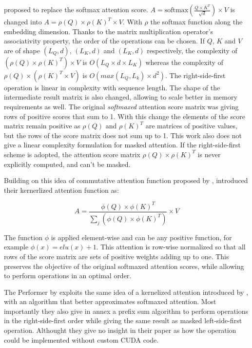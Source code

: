 \citet{shen2020efficient} proposed to
 replace the softmax attention score.
 $A = \mathrm{softmax}\left(\frac{Q \times K^T}{\sqrt{d}}\right) \times V$ is
changed into $A = \rho(Q) \times \rho(K)^T \times V$. With $\rho$
the softmax function along the embedding dimension. Thanks to the matrix
multiplication operator's associativity property, the order of the operations can be chosen.
If $Q$, $K$ and $V$ are of shape $(L_Q, d)$, $(L_K, d)$ and
$(L_K, d)$ respectively, the complexity of
$(\rho(Q) \times \rho(K)^T) \times V$ is $O(L_Q \times d \times L_K)$ whereas the complexity of
$\rho(Q) \times (\rho(K)^T \times V)$ is
$O\left(max(L_Q, L_k) \times d^2 \right)$. The right-side-first
operation is linear in complexity with sequence length. The shape of the
intermediate result matrix is also changed, allowing to scale better
in memory requirements as well. The original \emph{softmaxed} attention score
matrix was giving rows of positive scores that sum to 1. With this
change the elements of the score matrix remain positive as $\rho(Q)$
and $\rho(K)^T$ are matrices of positive values, but the rows of the score matrix does not sum up to 1. This work also does not give a linear complexity formulation for masked attention. If the right-side-first
scheme is adopted, the attention score matrix
$\rho(Q) \times \rho(K)^T$ is never explicitly computed, and can't be
masked.

Building on this idea of commutative attention function proposed by
\citep{shen2020efficient}, \citet{katharopoulos2020transformers} introduced their kernerlized attention function as:

\begin{equation}
A = \frac{\phi(Q) \times \phi(K)^T}{\sum_j \left( \phi(Q) \times \phi(K)^T \right)} \times V
\end{equation}

The function $\phi$ is applied element-wise and can be any positive
function, for example $\phi(x) = elu(x) + 1$. This attention is
row-wise normalized so that all rows of the score matrix are sets of
positive weights adding up to one. This preserves the objective of the
original softmaxed attention scores, while allowing to perform
operations in an optimal order.

The Performer by \citet{choromanski2021rethinking} exploits the same idea of a kernelized attention introduced
by \citet{katharopoulos2020transformers}, with an algorithm that better approximates softmaxed attention. Most
importantly they also give in annex a prefix sum algorithm to perform operations in the right-side-first order while giving the same result as masked left-side-first operation. Althought they give no insight in their paper as how the operation could be implemented without custom CUDA code.

